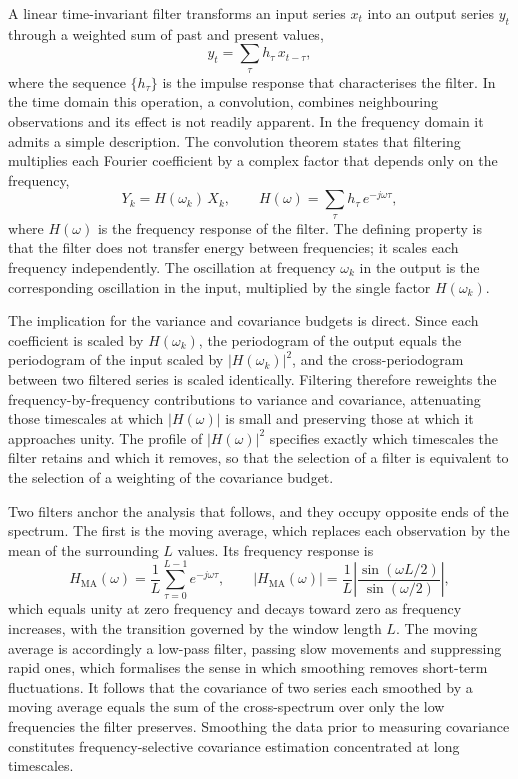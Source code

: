 \documentclass[12pt,a4paper]{article}
\begin{document}
A linear time-invariant filter transforms an input series $x_t$ into an
output series $y_t$ through a weighted sum of past and present values,
\begin{equation}
    y_t = \sum_{\tau} h_\tau \, x_{t-\tau},
\end{equation}
where the sequence $\{h_\tau\}$ is the impulse response that
characterises the filter. In the time domain this operation, a
convolution, combines neighbouring observations and its effect is not
readily apparent. In the frequency domain it admits a simple description.
The convolution theorem states that filtering multiplies each Fourier
coefficient by a complex factor that depends only on the frequency,
\begin{equation}
    Y_k = H(\omega_k) \, X_k, \qquad
    H(\omega) = \sum_{\tau} h_\tau \, e^{-j\omega\tau},
\end{equation}
where $H(\omega)$ is the frequency response of the filter. The defining
property is that the filter does not transfer energy between frequencies;
it scales each frequency independently. The oscillation at frequency
$\omega_k$ in the output is the corresponding oscillation in the input,
multiplied by the single factor $H(\omega_k)$.

The implication for the variance and covariance budgets is direct. Since
each coefficient is scaled by $H(\omega_k)$, the periodogram of the
output equals the periodogram of the input scaled by $|H(\omega_k)|^2$,
and the cross-periodogram between two filtered series is scaled
identically. Filtering therefore reweights the frequency-by-frequency
contributions to variance and covariance, attenuating those timescales at
which $|H(\omega)|$ is small and preserving those at which it approaches
unity. The profile of $|H(\omega)|^2$ specifies exactly which timescales
the filter retains and which it removes, so that the selection of a
filter is equivalent to the selection of a weighting of the covariance
budget.

Two filters anchor the analysis that follows, and they occupy opposite
ends of the spectrum. The first is the moving average, which replaces
each observation by the mean of the surrounding $L$ values. Its frequency
response is
\begin{equation}
    H_{\text{MA}}(\omega) = \frac{1}{L} \sum_{\tau=0}^{L-1} e^{-j\omega\tau},
    \qquad
    |H_{\text{MA}}(\omega)| = \frac{1}{L}\left|
    \frac{\sin(\omega L / 2)}{\sin(\omega / 2)} \right|,
\end{equation}
which equals unity at zero frequency and decays toward zero as frequency
increases, with the transition governed by the window length $L$. The
moving average is accordingly a low-pass filter, passing slow movements
and suppressing rapid ones, which formalises the sense in which smoothing
removes short-term fluctuations. It follows that the covariance of two
series each smoothed by a moving average equals the sum of the
cross-spectrum over only the low frequencies the filter preserves.
Smoothing the data prior to measuring covariance constitutes
frequency-selective covariance estimation concentrated at long
timescales.
\end{document}
